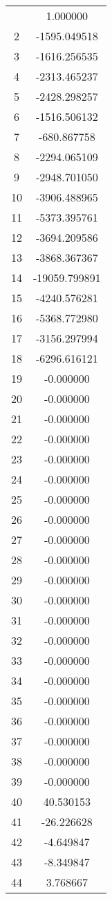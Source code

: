 \documentclass[12pt]{article}
\begin{document}
\begin{longtable}{@{}cc@{}}
\bottomrule
\endlastfoot
1 & 1.000000 \\
2 & -1595.049518 \\
3 & -1616.256535 \\
4 & -2313.465237 \\
5 & -2428.298257 \\
6 & -1516.506132 \\
7 & -680.867758 \\
8 & -2294.065109 \\
9 & -2948.701050 \\
10 & -3906.488965 \\
11 & -5373.395761 \\
12 & -3694.209586 \\
13 & -3868.367367 \\
14 & -19059.799891 \\
15 & -4240.576281 \\
16 & -5368.772980 \\
17 & -3156.297994 \\
18 & -6296.616121 \\
19 & -0.000000 \\
20 & -0.000000 \\
21 & -0.000000 \\
22 & -0.000000 \\
23 & -0.000000 \\
24 & -0.000000 \\
25 & -0.000000 \\
26 & -0.000000 \\
27 & -0.000000 \\
28 & -0.000000 \\
29 & -0.000000 \\
30 & -0.000000 \\
31 & -0.000000 \\
32 & -0.000000 \\
33 & -0.000000 \\
34 & -0.000000 \\
35 & -0.000000 \\
36 & -0.000000 \\
37 & -0.000000 \\
38 & -0.000000 \\
39 & -0.000000 \\
40 & 40.530153 \\
41 & -26.226628 \\
42 & -4.649847 \\
43 & -8.349847 \\
44 & 3.768667 \\

\end{longtable}
\end{document}
